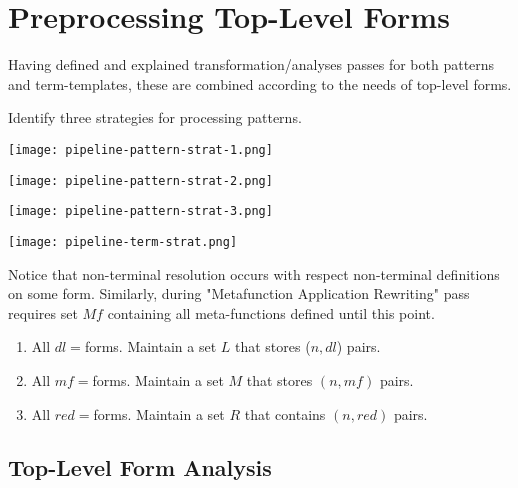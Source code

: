 \section{Preprocessing Top-Level Forms}

Having defined and explained transformation/analyses passes for both patterns and term-templates, these are combined according to the needs of top-level forms. 

Identify three strategies for processing patterns.

\texttt{[image: pipeline-pattern-strat-1.png]}

\texttt{[image: pipeline-pattern-strat-2.png]}

\texttt{[image: pipeline-pattern-strat-3.png]}

\texttt{[image: pipeline-term-strat.png]}

Notice that non-terminal resolution occurs with respect non-terminal definitions on some \DefineLanguageNoArg form. Similarly, during "Metafunction Application Rewriting" pass requires set $Mf$ containing all meta-functions defined until this point. 

\begin{enumerate}
\item All $dl=$\TlDefineLanguage \space forms. Maintain a set $L$ that stores ($n, dl$) pairs.
\item All $mf=$\TlDefineMetafunction \space forms. Maintain a set $M$ that stores $(n, mf)$ pairs.
\item All $red=$\TlDefineReductionRelation \space forms. Maintain a set $R$ that contains $(n, red)$ pairs.
\end{enumerate}

\subsection{Top-Level Form Analysis}

